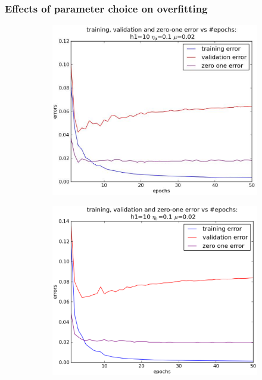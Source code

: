 \subsubsection{Effects of parameter choice on overfitting}
	\begin{figure}[!ht]
	\centering
	\begin{subfigure}[b]{.45\textwidth}
	\centering
	\includegraphics[width=\textwidth]{mlp/plots/test/15h1_overfitting_50_epochs.eps}
	\caption{}
	\label{subfig:overfit1}
	\end{subfigure}
	\quad
	\begin{subfigure}[b]{.45\textwidth}
	\centering
	\includegraphics[width=\textwidth]{mlp/plots/test/10h1_overfitting_50_epochs_mu002.eps}

\end{subfigure}
\end{figure}
